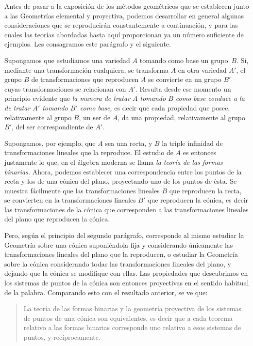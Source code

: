 \documentclass[a4paper, 12pt]{article}
\begin{document}
Antes de pasar a la exposición de los métodos geométricos que se establecen junto a las Geometrías elemental y proyectiva, podemos desarrollar en general algunas consideraciones que se reproducirán constantemente a continuación, y para las cuales las teorías abordadas hasta aquí proporcionan ya un número suficiente de ejemplos. Les consagramos este parágrafo y el siguiente.

Supongamos que estudiamos una variedad $A$ tomando como base un grupo~$B$. Si, mediante una transformación cualquiera, se transforma $A$ en otra variedad $A'$, el grupo $B$ de transformaciones que reproducen $A$ se convierte en un grupo $B'$ cuyas transformaciones se relacionan con $A'$. Resulta desde ese momento un principio evidente que \textit{la manera de tratar $A$ tomando $B$ como base conduce a la de tratar $A'$ tomando $B'$ como base,} es decir que cada propiedad que posee, relativamente al grupo $B$, un ser de $A$, da una propiedad, relativamente al grupo $B'$, del ser correspondiente de $A'$.

Supongamos, por ejemplo, que $A$ sea una recta, y $B$ la triple infinidad de transformaciones lineales que la reproduce. El estudio de $A$ es entonces justamente lo que, en el álgebra moderna se llama \textit{la teoría de las formas binarias.} Ahora, podemos establecer una correspondencia entre los puntos de la recta y los de una cónica del plano, proyectando uno de los puntos de ésta. Se muestra fácilmente que las transformaciones lineales $B$ que reproducen la recta, se convierten en la transformaciones lineales $B'$ que reproducen la cónica, es decir las transformaciones de la cónica que corresponden a las transformaciones lineales del plano que reproducen la cónica.

Pero, según el principio del segundo parágrafo, corresponde al mismo estudiar la Geometría sobre una cónica suponiéndola fija y considerando únicamente las transformaciones lineales del plano que la reproducen, o estudiar la Geometría sobre la cónica considerando todas las transformaciones lineales del plano, y dejando que la cónica se modifique con ellas. Las propiedades que descubrimos en los sistemas de puntos de la cónica son entonces proyectivas en el sentido habitual de la palabra. Comparando esto con el resultado anterior, se ve que:

\begin{quote}\it 

La teoría de las formas binarias y la geometría proyectiva de los sistemas de puntos de una cónica son equivalentes, es decir que a cada teorema relativo a las formas binarias corresponde uno relativo a esos sistemas de puntos, y recíprocamente.

\end{quote}
\end{document}

